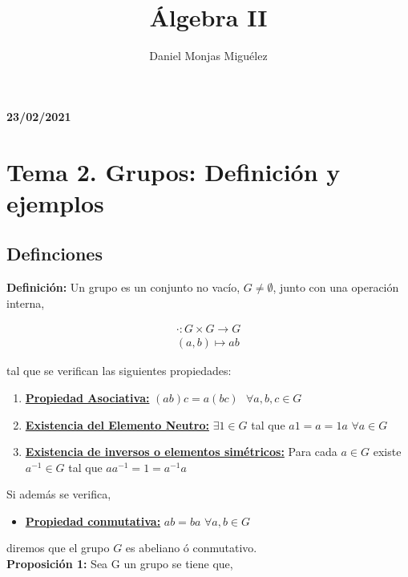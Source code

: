 \documentclass{article}
\author{Daniel Monjas Miguélez}
\title{Álgebra II}
\begin{document}
\maketitle

\newpage

\tableofcontents

\newpage

\textbf{23/02/2021} \\

\section{Tema 2. Grupos: Definición y ejemplos}
\subsection{Definciones}
\textbf{Definición:} Un grupo es un conjunto no vacío, $G \neq \emptyset$, junto con una operación interna,

\begin{equation*}
\begin{split}
\cdot : G \times G \rightarrow G \\
(a,b) \mapsto ab
\end{split}
\end{equation*}

tal que se verifican las siguientes propiedades:

\begin{enumerate}
\item \underline{\textbf{Propiedad Asociativa:}} $(ab)c=a(bc) \>\>\> \forall a,b,c \in G$
\item \underline{\textbf{Existencia del Elemento Neutro:}} $\exists 1 \in G$ tal que $a1=a=1a$ $\forall a \in G$
\item \underline{\textbf{Existencia de inversos o elementos simétricos:}} Para cada $a \in G$ existe $a^{-1} \in G$ tal que $aa^{-1}=1=a^{-1}a$
\end{enumerate}

Si además se verifica,

\begin{itemize}
\item \underline{\textbf{Propiedad conmutativa:}} $ab=ba$ $\forall a,b \in G$
\end{itemize}

diremos que el grupo $G$ es abeliano ó conmutativo. \\

\textbf{Proposición 1:} Sea G un grupo se tiene que,
\end{document}
